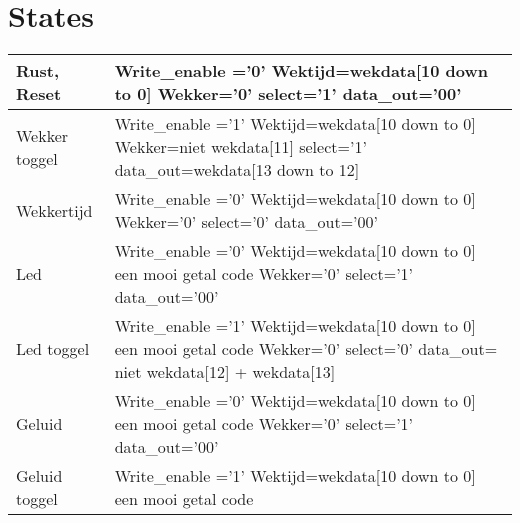 \documentclass[a4paper, oneside, 10pt]{article}
\begin{document}
\section{States}
\begin{longtable}{|l| p{10cm} |}
\hline
Rust, Reset &
Write{\_}enable ='0' \newline
Wektijd=wekdata[10 down to 0] \newline
Wekker='0' \newline
select='1' \newline
data{\_}out='00' \\ \hline
Wekker toggel &
Write{\_}enable ='1' \newline
Wektijd=wekdata[10 down to 0] \newline
Wekker=niet wekdata[11] \newline
select='1' \newline
data{\_}out=wekdata[13 down to 12] \\ \hline
Wekkertijd &
Write{\_}enable ='0' \newline
Wektijd=wekdata[10 down to 0] \newline
Wekker='0' \newline
select='0' \newline
data{\_}out='00' \\ \hline
Led &
Write{\_}enable ='0' \newline
Wektijd=wekdata[10 down to 0] een mooi getal code \newline
Wekker='0' \newline
select='1' \newline
data{\_}out='00' \\ \hline
Led toggel &
Write{\_}enable ='1' \newline
Wektijd=wekdata[10 down to 0] een mooi getal code \newline
Wekker='0' \newline
select='0' \newline
data{\_}out= niet wekdata[12] + wekdata[13] \\ \hline
Geluid & 
Write{\_}enable ='0' \newline
Wektijd=wekdata[10 down to 0] een mooi getal code \newline
Wekker='0' \newline
select='1' \newline
data{\_}out='00' \\ \hline
Geluid toggel &
Write{\_}enable ='1' \newline
Wektijd=wekdata[10 down to 0] een mooi getal code \newline

\end{longtable}
\end{document}
